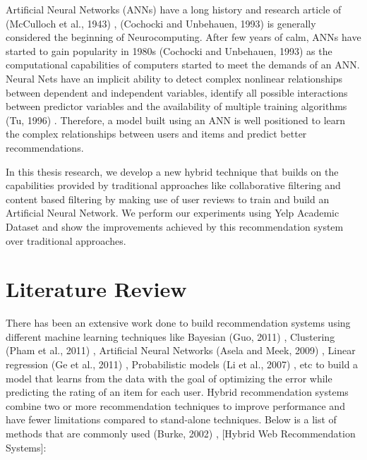 \documentclass[12pt]{article}
\begin{document}
Artificial Neural Networks (ANNs) have a long history and research article of (McCulloch et al., 1943) \cite{mcculloch}, (Cochocki and Unbehauen, 1993) \cite{cochocki} is generally considered the beginning of Neurocomputing. After few years of calm, ANNs have started to gain popularity in 1980s (Cochocki and Unbehauen, 1993) \cite{cochocki} as the computational capabilities of computers started to meet the demands of an ANN. Neural Nets have an implicit ability to detect complex nonlinear relationships between dependent and independent variables, identify all possible interactions between predictor variables and the availability of multiple training algorithms (Tu, 1996) \cite{tu}. Therefore, a model built using an ANN is well positioned to learn the complex relationships between users and items and predict better recommendations.

In this thesis research, we develop a new hybrid technique that builds on the capabilities provided by traditional approaches like collaborative filtering and content based filtering by making use of user reviews to train and build an Artificial Neural Network. We perform our experiments using Yelp Academic Dataset and show the improvements achieved by this recommendation system over traditional approaches.

\section{Literature Review}

There has been an extensive work done to build recommendation systems using different machine learning techniques like Bayesian (Guo, 2011) \cite{guo}, Clustering (Pham et al., 2011) \cite{pham}, Artificial Neural Networks (Asela and Meek, 2009) \cite{gunawardana}, Linear regression (Ge et al., 2011) \cite{ge}, Probabilistic models (Li et al., 2007) \cite{li}, etc to build a model that learns from the data with the goal of optimizing the error while predicting the rating of an item for each user. Hybrid recommendation systems combine two or more recommendation techniques to improve performance and have fewer limitations compared to stand-alone techniques. Below is a list of methods that are commonly used (Burke, 2002) \cite{burke}, [Hybrid Web Recommendation Systems]:
\end{document}
